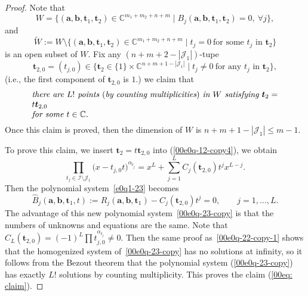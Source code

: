 \documentclass[10pt,a4paper]{amsart}
\numberwithin{equation}{section}
\def\C{\mathbb C}
\begin{document}
\begin{proof} Note that
\[W=\bigl\{(\boldsymbol a, \boldsymbol b, \boldsymbol t_1, \boldsymbol t_2)\in \C^{m_1+m_2+n+m}\mid B_j(\boldsymbol a, \boldsymbol b, \boldsymbol t_1, \boldsymbol t_2)=0,\ \forall j\bigr\},\]
and
\[\widetilde{W}:=W\setminus\bigl\{(\boldsymbol a, \boldsymbol b, \boldsymbol t_1, \boldsymbol t_2)\in \C^{m_1+m_2+n+m}\mid t_j=0\ \text{for some $t_j$ in $\boldsymbol t_2$}\bigr\}\]
is an open subset of $W$.
Fix any $(n+m+2-|\mathcal{J}_1|)$-tupe
\[
\boldsymbol t_{2,0}=(t_{j,0})\in \bigl\{\boldsymbol t_2\in \{1\}\times\C^{n+m+1-|\mathcal{J}_1|}\mid t_{j}\neq 0\ \text{for any $t_j$ in $\boldsymbol t_2$}\bigr\},
\]
(i.e., the first component of $\boldsymbol t_{2,0}$ is $1$.) we claim that
\begin{equation} \label{00eq: claim}
 \parbox{\dimexpr\linewidth-5em}{\it
 there are $L!$ points $($by counting multiplicities$)$ in $W$ satisfying $\boldsymbol t_2=t\boldsymbol t_{2,0}$\\ for some~${t\in\mathbb{C}}$.
 }
\end{equation}
Once this claim is proved, then the dimension of $W$ is $n+m+1-|\mathcal{J}_1|\leq m-1$.

To prove this claim, we insert $\boldsymbol t_2=t\boldsymbol t_{2,0}$ into (\ref{00e0q-12-copy4}), we obtain
\begin{equation*}%
\prod_{t_j\in \mathcal{I}\setminus\mathcal{J}_1}\bigl(x-t_{j,0}t\bigr)^{{\alpha}_{t_j}}
=x^{L}
+\sum_{j=1}^{L}
C_j(\boldsymbol t_{2,0})t^jx^{L-j}.\end{equation*}
Then the polynomial system~\eqref{e0q1-23} becomes
\begin{equation}\label{00e0q-23-copy}
\widehat{B}_j(\boldsymbol a, \boldsymbol b,\boldsymbol t_1, t):=R_{j}(\boldsymbol a, \boldsymbol b,\boldsymbol t_1)-C_j(\boldsymbol t_{2,0})t^j=0,\qquad j=1,\dots, L.
\end{equation}
The advantage of this new polynomial system~\eqref{00e0q-23-copy} is that
the numbers of unknowns and equations are the same. Note that $C_{L}(\boldsymbol t_{2,0})=(-1)^{L}\prod t_{j,0}^{{\alpha}_{t_j}}\neq 0$.
Then the same proof as~\eqref{00e0q-22-copy-1} shows that the homogenized system of~\eqref{00e0q-23-copy} has no solutions at infinity, so it follows from the Bezout theorem that the polynomial system (\ref{00e0q-23-copy}) has exactly
$L!$
solutions by counting multiplicity. This proves the claim (\ref{00eq: claim}).
\end{proof}
\end{document}
